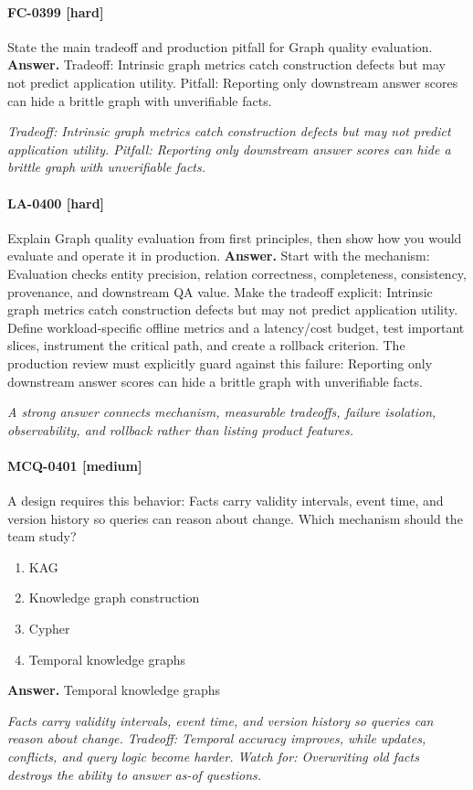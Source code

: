 \paragraph{FC-0399 [hard]} State the main tradeoff and production pitfall for Graph quality evaluation.
\noindent\textbf{Answer.} Tradeoff: Intrinsic graph metrics catch construction defects but may not predict application utility. Pitfall: Reporting only downstream answer scores can hide a brittle graph with unverifiable facts.
\par\textit{Tradeoff: Intrinsic graph metrics catch construction defects but may not predict application utility. Pitfall: Reporting only downstream answer scores can hide a brittle graph with unverifiable facts.}
\paragraph{LA-0400 [hard]} Explain Graph quality evaluation from first principles, then show how you would evaluate and operate it in production.
\noindent\textbf{Answer.} Start with the mechanism: Evaluation checks entity precision, relation correctness, completeness, consistency, provenance, and downstream QA value. Make the tradeoff explicit: Intrinsic graph metrics catch construction defects but may not predict application utility. Define workload-specific offline metrics and a latency/cost budget, test important slices, instrument the critical path, and create a rollback criterion. The production review must explicitly guard against this failure: Reporting only downstream answer scores can hide a brittle graph with unverifiable facts.
\par\textit{A strong answer connects mechanism, measurable tradeoffs, failure isolation, observability, and rollback rather than listing product features.}
\paragraph{MCQ-0401 [medium]} A design requires this behavior: Facts carry validity intervals, event time, and version history so queries can reason about change. Which mechanism should the team study?
\begin{enumerate}[label=\Alph*.]
\item KAG
\item Knowledge graph construction
\item Cypher
\item Temporal knowledge graphs
\end{enumerate}
\noindent\textbf{Answer.} Temporal knowledge graphs
\par\textit{Facts carry validity intervals, event time, and version history so queries can reason about change. Tradeoff: Temporal accuracy improves, while updates, conflicts, and query logic become harder. Watch for: Overwriting old facts destroys the ability to answer as-of questions.}
